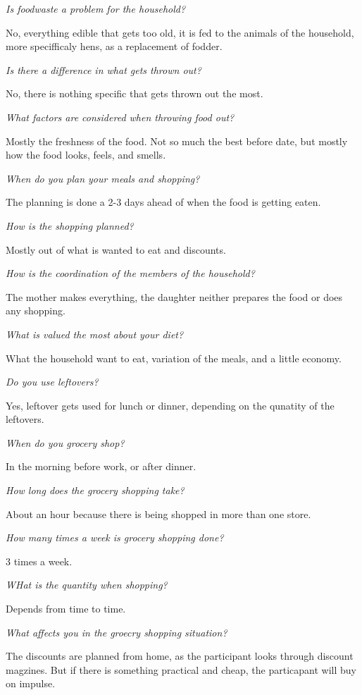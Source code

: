 \emph{Is foodwaste a problem for the household?}

No, everything edible that gets too old, it is fed to the animals of the household, more specifficaly hens, as a replacement of fodder.

\emph{Is there a difference in what gets thrown out?}

No, there is nothing specific that gets thrown out the most.

\emph{What factors are considered when throwing food out?}

Mostly the freshness of the food. Not so much the best before date, but mostly how the food looks, feels, and smells.

\emph{When do you plan your meals and shopping?}

The planning is done a 2-3 days ahead of when the food is getting eaten.

\emph{How is the shopping planned?}

Mostly out of what is wanted to eat and discounts.

\emph{How is the coordination of the members of the household?}

The mother makes everything, the daughter neither prepares the food or does any shopping.

\emph{What is valued the most about your diet?}

What the household want to eat, variation of the meals, and a little economy.

\emph{Do you use leftovers?}

Yes, leftover gets used for lunch or dinner, depending on the qunatity of the leftovers.

\emph{When do you grocery shop?}

In the morning before work, or after dinner.

\emph{How long does the grocery shopping take?}

About an hour because there is being shopped in more than one store.

\emph{How many times a week is grocery shopping done?}

3 times a week.

\emph{WHat is the quantity when shopping?}

Depends from time to time.

\emph{What affects you in the groecry shopping situation?}

The discounts are planned from home, as the participant looks through discount magzines. But if there is something practical and cheap, the particapant will buy on impulse.


